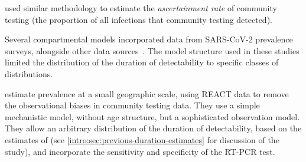 \documentclass[thesis.tex]{subfiles}
\begin{document}
\Textcite{colmanAscertainment} used similar methodology to estimate the \emph{ascertainment rate} of community testing (the proportion of all infections that community testing detected).

Several compartmental models incorporated data from SARS-CoV-2 prevalence surveys, alongside other data sources~\autocite{daviesAssociation,ironsEstimating,knockKey,nicholsonImproving,pooleyEstimation,birrellRTM2}.
The model structure used in these studies limited the distribution of the duration of detectability to specific classes of distributions.

\Textcite{nicholsonImproving} estimate prevalence at a small geographic scale, using REACT data to remove the observational biases in community testing data.
They use a simple mechanistic model, without age structure, but a sophisticated observation model.
They allow an arbitrary distribution of the duration of detectability, based on the estimates of \textcite{hellewellPCRSensitivity} (see \cref{intro:sec:previous-duration-estimates} for discussion of the \textcite{hellewellPCRSensitivity} study), and incorporate the sensitivity and specificity of the RT-PCR test.
\end{document}
